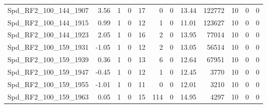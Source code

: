 \begin{longtable}[c]{@{}lrrrrrrrrrrr@{}}
Spd\_RF2\_100\_144\_1907     & 3.56                   & 1                       & 0                       & 17                     & 0                       & 0                       & 13.44                   & 122772                   & 10                       & 0                        & 0                        \\
Spd\_RF2\_100\_144\_1915     & 0.99                   & 1                       & 0                       & 12                     & 1                       & 0                       & 11.01                   & 123627                   & 10                       & 0                        & 0                        \\
Spd\_RF2\_100\_144\_1923     & 2.05                   & 1                       & 0                       & 16                     & 2                       & 0                       & 13.95                   & 77014                    & 10                       & 0                        & 0                        \\
Spd\_RF2\_100\_159\_1931     & -1.05                  & 1                       & 0                       & 12                     & 2                       & 0                       & 13.05                   & 56514                    & 10                       & 0                        & 0                        \\
Spd\_RF2\_100\_159\_1939     & 0.36                   & 1                       & 0                       & 13                     & 6                       & 0                       & 12.64                   & 67951                    & 10                       & 0                        & 0                        \\
Spd\_RF2\_100\_159\_1947     & -0.45                  & 1                       & 0                       & 12                     & 1                       & 0                       & 12.45                   & 3770                     & 10                       & 0                        & 0                        \\
Spd\_RF2\_100\_159\_1955     & -1.01                  & 1                       & 0                       & 11                     & 0                       & 0                       & 12.01                   & 3210                     & 10                       & 0                        & 0                        \\
Spd\_RF2\_100\_159\_1963     & 0.05                   & 1                       & 0                       & 15                     & 114                     & 0                       & 14.95                   & 4297                     & 10                       & 0                        & 0                        \\

\end{longtable}
